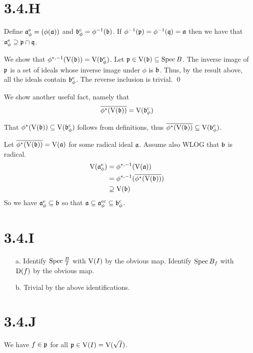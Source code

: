 \documentclass{article}
\begin{document}
\section{3.4.H}
Define $\mathfrak{a}_{\phi}^{\text{e}}=(\phi(\mathfrak{a}))$ and $\mathfrak{b}_{\phi}^{\text{c}}=\phi^{-1}(\mathfrak{b})$. If
$\phi^{-1}(\mathfrak{p})=\phi^{-1}(\mathfrak{q})=\mathfrak{a}$ then we have that $\mathfrak{a}_{\phi}^{\text{e}} \supseteq \mathfrak{p} \cap \mathfrak{q}$.

We show that $\phi^{*,-1}(\operatorname{V}(\mathfrak{b}))=\operatorname{V}(\mathfrak{b}_\phi^{\text{e}})$. Let $\mathfrak{p} \in \operatorname{V}(\mathfrak{b}) \subseteq \operatorname{Spec}{B}$. The inverse
image of $\mathfrak{p}$ is a set of ideals whose inverse image under
$\phi$ is $\mathfrak{b}$. Thus, by the result above,
all the ideals contain $\mathfrak{b}_\phi^{\text{e}}$. The reverse inclusion is
trivial. \qed

We show another useful fact, namely that
\begin{equation*}
    \overline{\phi^*(\operatorname{V}(\mathfrak{b}))}=\operatorname{V}(\mathfrak{b}^{\text{c}}_\phi)
\end{equation*}

That $\phi^*(\operatorname{V}(\mathfrak{b})) \subseteq \operatorname{V}(\mathfrak{b}^{\text{c}}_\phi)$ follows from definitions, thus
$\overline{\phi^*(\operatorname{V}(\mathfrak{b}))} \subseteq \operatorname{V}(\mathfrak{b}^{\text{c}}_\phi)$.

Let $\overline{\phi^*(\operatorname{V}(\mathfrak{b}))}=\operatorname{V}(\mathfrak{a})$ for some radical ideal $\mathfrak{a}$.
Assume also WLOG that $\mathfrak{b}$ is radical.
\begin{align*}
    \operatorname{V}(\mathfrak{a}^\text{e}_\phi) & =\phi^{*,-1}(\operatorname{V}(\mathfrak{a}))                     \\
                          & = \phi^{*,-1}(\overline{\phi^*(\operatorname{V}(\mathfrak{b}))}) \\
                          & \supseteq \operatorname{V}(\mathfrak{b})
\end{align*}
So we have $\mathfrak{a}^{\text{e}}_\phi \subseteq \mathfrak{b}$ so that $\mathfrak{a} \subseteq \mathfrak{a}^{\text{ec}}_\phi \subseteq
    \mathfrak{b}^{\text{c}}_\phi$.

\section{3.4.I}
\begin{itemize}
    \item [a.] Identify $\operatorname{Spec}\frac{B}{I}$ with $\operatorname{V}(I)$ by the obvious
          map. Identify $\operatorname{Spec} B_f$ with $\operatorname{D}(f)$ by the obvious
          map.
    \item [b.] Trivial by the above identifications.
\end{itemize}

\section{3.4.J}
We have $f \in \mathfrak{p}$ for all $\mathfrak{p} \in \operatorname{V}(I) = \operatorname{V}(\sqrt{I})$.
\end{document}
